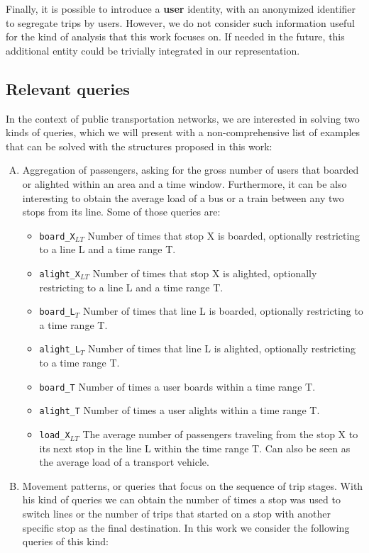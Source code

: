 \documentclass[runningheads]{llncs}
\begin{document}
Finally, it is possible to introduce a \textbf{user} identity, with an anonymized identifier to segregate trips by users. However, we do not consider such information useful for the kind of analysis that this work focuses on. If needed in the future, this additional entity could be trivially integrated in our representation.

\subsection{Relevant queries}
\label{sec:rq}
In the context of public transportation networks, we are interested in solving two kinds of queries, which we will present with a non-comprehensive list of examples that can be solved with the structures proposed in this work:

\begin{enumerate}[A)]
    \item Aggregation of passengers, asking for the gross number of users that boarded or alighted within an area and a time window. Furthermore, it can be also interesting to obtain the average load of a bus or a train between any two stops from its line. Some of those queries are:
    \begin{itemize}
        \item \texttt{board\_X$_{LT}$} Number of times that stop X is boarded, optionally restricting to a line L and a time range T.
        \item \texttt{alight\_X$_{LT}$} Number of times that stop X is alighted, optionally restricting to a line L and a time range T.
        \item \texttt{board\_L$_T$}  Number of times that line L is boarded, optionally restricting to a time range T.
        \item \texttt{alight\_L$_T$} Number of times that line L is alighted, optionally restricting to a time range T.
        \item \texttt{board\_T} Number of times a user boards within a time range T.
        \item \texttt{alight\_T} Number of times a user alights within a time range T.
        \item \texttt{load\_X$_{LT}$} The average number of passengers traveling from the stop X to its next stop in the line L within the time range T. Can also be seen as the average load of a transport vehicle.
    \end{itemize}
    \item Movement patterns, or queries that focus on the sequence of trip stages. With his kind of queries we can obtain the number of times a stop was used to switch lines or the number of trips that started on a stop with another specific stop as the final destination. In this work we consider the following queries of this kind:

\end{enumerate}
\end{document}
